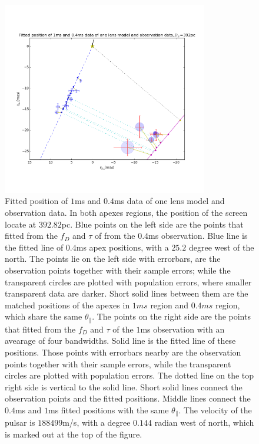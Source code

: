 \documentclass[useAMS,usenatbib]{mn2e}
\begin{document}
\begin{figure}
\centering
\includegraphics[width=0.8\textwidth, angle=0]{One_lens_392pc.png}
\caption{Fitted position of $1$ms and $0.4$ms data of one lens model and observation data. In both apexes regions, the position of the screen locate at $392.82$pc. Blue points on the left side are the points that fitted from the $f_D$ and $\tau$ of from the $0.4$ms observation. Blue line is the fitted line of $0.4$ms apex positions, with a $25.2$ degree west of the north. The points lie on the left side with errorbars, are the observation points together with their sample errors; while the transparent circles are plotted with population errors, where smaller transparent data are darker. Short solid lines between them are the matched positions of the apexes in $1ms$ region and $0.4ms$ region, which share the same $\theta_{\parallel}$. The points on the right side are the points that fitted from the $f_D$ and $\tau$ of the $1$ms observation with an avearage of four bandwidths. Solid line is the fitted line of these positions. Those points with errorbars nearby are the observation points together with their sample errors, while the transparent circles are plotted with population errors. The dotted line on the top right side is vertical to the solid line. Short solid lines connect the observation points and the fitted positions. Middle lines connect the $0.4$ms and $1$ms fitted positions with the same $\theta_{\parallel}$. The velocity of the pulsar is $188499$m/s, with a degree $0.144$ radian west of north, which is marked out at the top of the figure.  }
\label{Onelens}
\end{figure}
\end{document}
